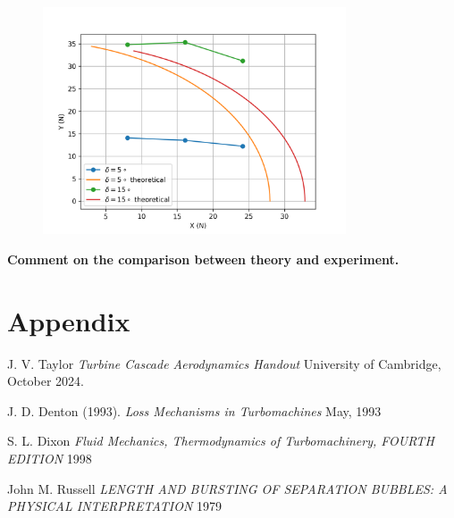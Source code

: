 \documentclass{article}
\begin{document}
\begin{figure}[H]
    \centering
    \includegraphics[width=0.8\textwidth]{5.3/XvsY.png}
    \caption{}
    \label{fig:lateral_force_vs_longitudinal_force}
\end{figure}

\begin{center}
    \textbf{Comment on the comparison between theory and experiment.}
\end{center}

\section{Appendix}

\begin{thebibliography}{9}


  J. V. Taylor
  \emph{Turbine Cascade Aerodynamics Handout}
  University of Cambridge,
  October 2024.

  J. D. Denton (1993).
  \emph{Loss Mechanisms in Turbomachines}
  May, 1993 

  S. L. Dixon
  \emph{Fluid Mechanics, Thermodynamics of Turbomachinery, FOURTH EDITION}
  1998

  John M. Russell
  \emph{LENGTH AND BURSTING OF SEPARATION BUBBLES: A PHYSICAL INTERPRETATION}
  1979
\end{thebibliography}
\end{document}
